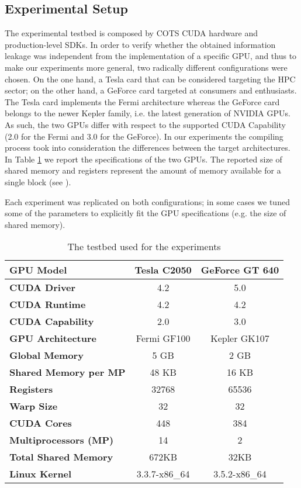 \documentclass[11pt,onecolumn,letterpaper]{IEEEtran}
\begin{document}
\subsection{Experimental Setup}
\label{sub:exp_setup}

The experimental testbed is composed by COTS CUDA hardware and production-level SDKs.
In order to verify whether the obtained information leakage was independent from the implementation of a specific GPU,
and thus to make our experiments more general, two radically different configurations were chosen.
On the one hand, a Tesla card that can be considered targeting the HPC sector;
on the other hand, a GeForce card targeted at consumers and enthusiasts. 
The Tesla card implements the Fermi architecture whereas the GeForce card belongs to the newer Kepler family, i.e. the latest generation of NVIDIA GPUs.
As such, the two GPUs differ with respect to the supported CUDA Capability (2.0 for the Fermi and 3.0 for the GeForce).
In our experiments the compiling process took into consideration the differences between the target architectures.
In Table \ref{tab:testbed} we report the specifications of the two GPUs. 
The reported size of shared memory and registers represent the amount of memory available for a single block (see \cite{cudadevguide}).

Each experiment was replicated on both configurations;
in some cases we tuned some of the parameters to explicitly fit the GPU specifications (e.g. the size of shared memory).

\begin{center}
\begin{table}
	\centering
	\caption{The testbed used for the experiments}
\begin{tabular}{| l | c | c |}
		\hline
	 	\textbf{GPU Model} & Tesla C2050 & GeForce GT 640 \\
		\hline
		\textbf{CUDA Driver} & 4.2 & 5.0 \\
		\hline
	 	\textbf{CUDA Runtime} & 4.2 & 4.2 \\
	 	\hline
	 	\textbf{CUDA Capability} & 2.0 & 3.0 \\
	 	\hline
	 	\textbf{GPU Architecture} & Fermi GF100 & Kepler GK107 \\
	    \hline
	 	\textbf{Global Memory} & 5 GB & 2 GB \\
	 	\hline
	 	\textbf{Shared Memory per MP} & 48 KB & 16 KB \\
	    \hline
	 	\textbf{Registers} & 32768  & 65536 \\
	 	\hline
	 	\textbf{Warp Size} & 32 & 32 \\ 	
	 	\hline
	 	\textbf{CUDA Cores} & 448 & 384 \\
	 	\hline
	 	\textbf{Multiprocessors (MP)} & 14 & 2 \\
	 	\hline
	 	\textbf{Total Shared Memory} & 672KB & 32KB \\
	 	\hline
		\textbf{Linux Kernel} & 3.3.7-x86\_64 & 3.5.2-x86\_64 \\
	 	\hline
	\end{tabular}
	\smallskip
	\smallskip
\label{tab:testbed}
\end{table}
\end{center}
\end{document}
